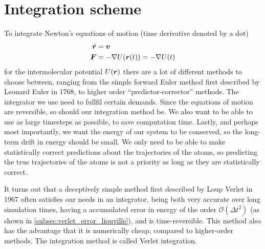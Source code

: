 \section{Integration scheme}
To integrate Newton's equations of motion (time derivative denoted by a dot)
\begin{align*}
    \dot {\boldsymbol{r}} &= \boldsymbol{v} \\
    \boldsymbol{F} &= -\nabla U(\boldsymbol{r}(t)) = -\nabla U(t)
\end{align*}
for the intermolecular potential $U(\boldsymbol{r})$ there are a lot of different methods to choose between, ranging from the simple forward Euler method first described by Leonard Euler in 1768, to higher order ``predictor-corrector'' methods. The integrator we use need to fullfil certain demands. Since the equations of motion are reversible, so should our integration method be. We also want to be able to use as large timesteps as possible, to save computation time. Lastly, and perhaps most importantly, we want the energy of our system to be conserved, so the long-term drift in energy should be small. We only need to be able to make statistically correct predictions about the trajectories of the atoms, so predicting the true trajectories of the atoms is not a priority as long as they are statistically correct.


It turns out that a deceptively simple method first described by Loup Verlet in 1967\cite{verlet1967computer} often satisfies our needs in an integrator, being both very accurate over long simulation times, having a accumulated error in energy of the order $\mathcal{O}(\Delta t^2)$ (as shown in \cref{subsec:verlet_error_liouville}), and is time-reversible. This method also has the advantage that it is numerically cheap, compared to higher-order methods. The integration method is called Verlet integration.

